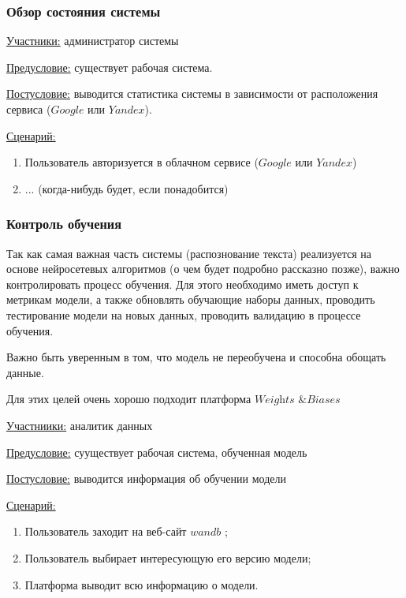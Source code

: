 \subsubsection{Обзор состояния системы}
\underline{Участники:} администратор системы

\underline{Предусловие:} существует рабочая система.

\underline{Постусловие:} выводится статистика системы в зависимости от расположения сервиса ($Google$ или $Yandex$).

\underline{Сценарий:}
\begin{enumerate}
    \item Пользователь авторизуется в облачном сервисе ($Google$ или $Yandex$)
    \item ... (когда-нибудь будет, если понадобится)
\end{enumerate}

\subsubsection{Контроль обучения}

Так как самая важная часть системы (распознование текста) реализуется на основе нейросетевых алгоритмов (о чем будет подробно рассказно позже), важно контролировать процесс обучения.
Для этого необходимо иметь доступ к метрикам модели, а также обновлять обучающие наборы данных, проводить тестирование модели на новых данных, проводить валидацию в процессе обучения.

Важно быть уверенным в том, что модель не переобучена и способна обощать данные.

Для этих целей очень хорошо подходит платформа $\textit{Weights \& Biases}$ \cite{wandb}

\underline{Участниики:} аналитик данных

\underline{Предусловие:} сууществует рабочая система, обученная модель

\underline{Постусловие:} выводится информация об обучении модели

\underline{Сценарий:}

\begin{enumerate}
    \item Пользователь заходит на веб-сайт $wandb$ \cite{wandb};
    \item Пользователь выбирает интересующую его версию модели; 
    \item Платформа выводит всю информацию о модели.
\end{enumerate}


